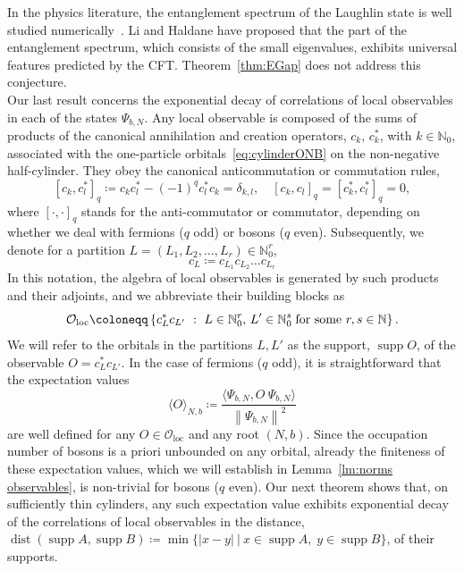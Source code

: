 \documentclass[letterpaper, DIV=17]{scrartcl}
\numberwithin{equation}{section}
\theoremstyle{definition}
\DeclareMathOperator{\dist}{dist}
\DeclareMathOperator{\supp}{supp}
\newcommand{\loc}{\mathrm{loc}}
\begin{document}
In the physics literature, the entanglement spectrum of the Laughlin state is well studied numerically~\cite{li2008entanglement,Thomale:2010aa,Lauchli:2010aa}. Li and Haldane have proposed \cite{li2008entanglement} that the part of the entanglement spectrum, which consists of the small eigenvalues, exhibits universal features predicted by the CFT. Theorem~\ref{thm:EGap} does not address this conjecture. \\


Our last result concerns the exponential decay of correlations of local observables in each of the states $ \Psi_{b,N} $. Any local observable is composed of the sums of products of 
the canonical annihilation and creation operators, $ c_k $, $ c_k^* $, with $ k \in \mathbb{N}_0 $, associated with the one-particle orbitals~\eqref{eq:cylinderONB} on the non-negative half-cylinder. They obey the canonical anticommutation or commutation rules,
$$
[ c_k , c^*_l ]_q \coloneqq c_k c_l^* - (-1)^q c^*_l c_ k = \delta_{k,l} , \quad [c_k, c_l ]_q =  [c_k^*, c_l^* ]_q = 0 ,
$$
where $ [ \cdot, \cdot ]_q $ stands for the anti-commutator or commutator, depending on whether we deal with fermions ($q$ odd) or bosons ($q$ even). Subsequently, we denote for a partition $ L = (L_1, L_2 , \dots , L_r) \in \mathbb{N}_0^r $,
$$
c_L \coloneqq  c_{L_1} c_{L_2} \dots c_{L_r} 
$$
In this notation, the algebra of local observables is generated by such products and their adjoints, and we abbreviate their building blocks as
$$
\mathcal{O}_\loc \coloneqq \left\{ c^*_L c_{L'} \ : \  L \in \mathbb{N}_0^r , \,  L' \in \mathbb{N}_0^s  \; \mbox{for some $ r,s \in \mathbb{N}$} \right\} . 
$$
We will refer to the orbitals in the partitions $ L, L' $ as the support, $ \supp O $, of the observable  $O = c^*_L c_{L'}$.
%
In the case of fermions ($q $ odd), it is straightforward that the expectation values  
$$  \langle O \rangle_{N,b} \coloneqq \frac{\langle \Psi_{b,N} ,O \   \Psi_{b,N}\rangle}{\left\| \Psi_{b,N}\right\|^2}  $$
are well defined for any $ O \in \mathcal{O}_\loc $ and any root $ (N,b) $. Since the occupation number of bosons is a priori unbounded on any orbital, already the finiteness of these expectation values, which we will establish in Lemma~\ref{lm:norms observables}, is non-trivial for bosons ($q $ even).
Our next theorem shows that, on sufficiently thin cylinders, any such expectation value exhibits exponential decay of the correlations of local observables in the distance, $ \dist(\supp A,\supp B)  \coloneqq \min \{ |x-y| \ | \ x \in \supp A , \;  y \in \supp B \} $, of their supports.
%
\end{document}

